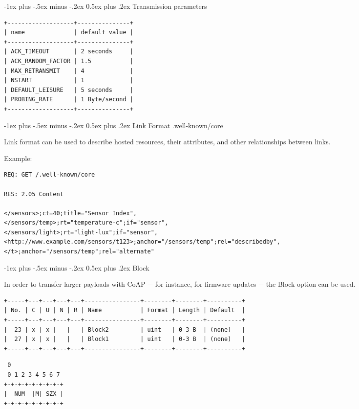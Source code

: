 \documentclass[10pt,landscape]{article}
\makeatletter
\renewcommand{\section}{\@startsection{section}{1}{0mm}%
                                {-1ex plus -.5ex minus -.2ex}%
                                {0.5ex plus .2ex}%
                                {\normalfont\large\bfseries}}
\makeatother
\begin{document}
\begin{multicols}{3}
\section{Transmission parameters}
{\tiny
\begin{verbatim}
+-------------------+---------------+
| name              | default value |
+-------------------+---------------+
| ACK_TIMEOUT       | 2 seconds     |
| ACK_RANDOM_FACTOR | 1.5           |
| MAX_RETRANSMIT    | 4             |
| NSTART            | 1             |
| DEFAULT_LEISURE   | 5 seconds     |
| PROBING_RATE      | 1 Byte/second |
+-------------------+---------------+
\end{verbatim}
}

\section{Link Format .well-known/core}

Link format can be used to describe hosted resources, their
attributes, and other relationships between links.

{\tiny
Example:
\begin{verbatim}
REQ: GET /.well-known/core

RES: 2.05 Content

</sensors>;ct=40;title="Sensor Index",
</sensors/temp>;rt="temperature-c";if="sensor",
</sensors/light>;rt="light-lux";if="sensor",
<http://www.example.com/sensors/t123>;anchor="/sensors/temp";rel="describedby",
</t>;anchor="/sensors/temp";rel="alternate"
\end{verbatim}
}

\section{Block}

In order to transfer larger payloads with CoAP $-$ for instance, for
firmware updates $-$ the Block option can be used.

{\tiny
\begin{verbatim}
+-----+---+---+---+---+----------------+--------+--------+----------+
| No. | C | U | N | R | Name           | Format | Length | Default  |
+-----+---+---+---+---+----------------+--------+--------+----------+
|  23 | x | x |   |   | Block2         | uint   | 0-3 B  | (none)   |
|  27 | x | x |   |   | Block1         | uint   | 0-3 B  | (none)   |
+-----+---+---+---+---+----------------+--------+--------+----------+
\end{verbatim}
}
{\tiny
\begin{verbatim}
 0
 0 1 2 3 4 5 6 7
+-+-+-+-+-+-+-+-+
|  NUM  |M| SZX |
+-+-+-+-+-+-+-+-+


\end{verbatim}}
\end{multicols}
\end{document}
